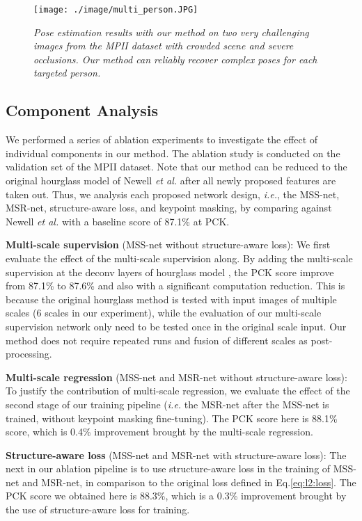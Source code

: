 \documentclass[runningheads]{llncs}
\begin{document}
\begin{figure}[t]
\centerline{
  \texttt{[image: ./image/multi\_person.JPG]}
}
\caption{\small \em Pose estimation results with our method on two very challenging images from the MPII dataset with crowded scene and severe occlusions. Our method can reliably recover complex poses for each targeted person.}
\label{fig:multi-person}
\end{figure}


\subsection{Component Analysis}
\label{sec:component:analysis}

We performed a series of ablation experiments to investigate the effect of individual components in our method. The ablation study is conducted on the validation set \cite{tompson2014joint} of the MPII dataset. 
Note that our method can be reduced to the original hourglass model of Newell {\em et al.} \cite{newell2016stacked} after all newly proposed features are taken out.
Thus, we analysis each proposed network design, {\em i.e.}, the MSS-net, MSR-net, structure-aware loss, and keypoint masking, by comparing against Newell {\em et al.} with a baseline score of 87.1\% at PCK.



{\bf Multi-scale supervision} (MSS-net without structure-aware loss): We first evaluate the effect of the multi-scale supervision along. By adding the multi-scale supervision at the deconv layers of hourglass model \cite{newell2016stacked}, the PCK score improve from 87.1\% to 87.6\% and also with a significant computation reduction. This is because the original hourglass method \cite{newell2016stacked} is tested with input images of multiple scales (6 scales in our experiment), while the evaluation of our multi-scale supervision network only need to be tested once in the original scale input. Our method does not require repeated runs and fusion of different scales as post-processing.

{\bf Multi-scale regression} (MSS-net and MSR-net without structure-aware loss): To justify the contribution of multi-scale regression, we evaluate the effect of the second stage of our training pipeline ({\em i.e.} the 
MSR-net after the MSS-net is trained, without keypoint masking fine-tuning). The PCK score here is 88.1\% score, which is 0.4\% improvement brought by the multi-scale regression.

{\bf Structure-aware loss} (MSS-net and MSR-net with structure-aware loss): The next in our ablation pipeline is to use structure-aware loss in the training of MSS-net and MSR-net, in comparison to the original loss defined in Eq.\ref{eq:l2:loss}. The PCK score we obtained here is 88.3\%, which is a 0.3\% improvement brought by the use of structure-aware loss for training.
 
\end{document}

